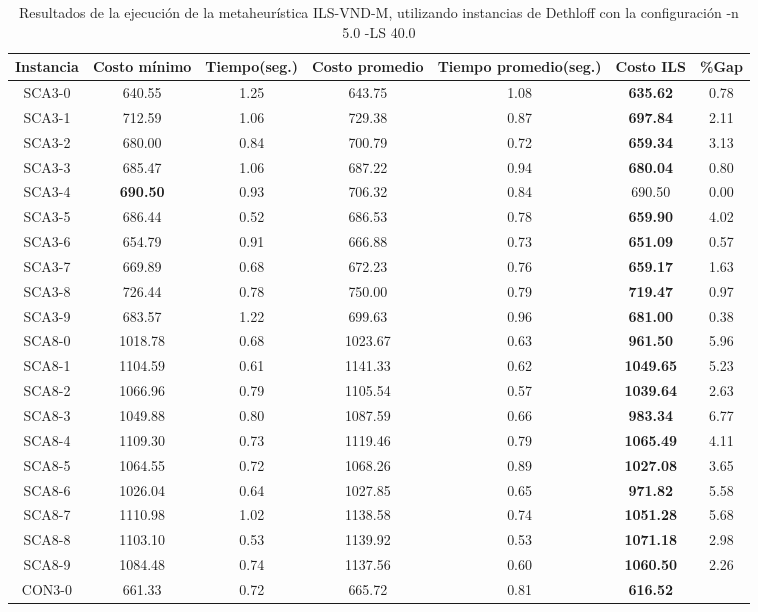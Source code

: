 \begin{table}[h]
\caption{Resultados de la ejecución de la metaheurística ILS-VND-M, utilizando instancias de Dethloff con la configuración -n 5.0 -LS 40.0}
\centering
\small
\begin{tabular}{c c c c c c c}
\hline\hline
Instancia & Costo mínimo & Tiempo(seg.) & Costo promedio & Tiempo promedio(seg.) & Costo ILS & \%Gap \\ [0.5ex]
\hline
SCA3-0 & 640.55 & 1.25 & 
643.75 & 1.08 & \bf{635.62} & 
0.78\\SCA3-1 & 712.59 & 1.06 & 
729.38 & 0.87 & \bf{697.84} & 
2.11\\SCA3-2 & 680.00 & 0.84 & 
700.79 & 0.72 & \bf{659.34} & 
3.13\\SCA3-3 & 685.47 & 1.06 & 
687.22 & 0.94 & \bf{680.04} & 
0.80\\SCA3-4 & \bf{690.50} & 0.93 & 
706.32 & 0.84 & 690.50 & 0.00\\
SCA3-5 & 686.44 & 0.52 & 
686.53 & 0.78 & \bf{659.90} & 
4.02\\SCA3-6 & 654.79 & 0.91 & 
666.88 & 0.73 & \bf{651.09} & 
0.57\\SCA3-7 & 669.89 & 0.68 & 
672.23 & 0.76 & \bf{659.17} & 
1.63\\SCA3-8 & 726.44 & 0.78 & 
750.00 & 0.79 & \bf{719.47} & 
0.97\\SCA3-9 & 683.57 & 1.22 & 
699.63 & 0.96 & \bf{681.00} & 
0.38\\SCA8-0 & 1018.78 & 0.68 & 
1023.67 & 0.63 & \bf{961.50} & 
5.96\\SCA8-1 & 1104.59 & 0.61 & 
1141.33 & 0.62 & \bf{1049.65} & 
5.23\\SCA8-2 & 1066.96 & 0.79 & 
1105.54 & 0.57 & \bf{1039.64} & 
2.63\\SCA8-3 & 1049.88 & 0.80 & 
1087.59 & 0.66 & \bf{983.34} & 
6.77\\SCA8-4 & 1109.30 & 0.73 & 
1119.46 & 0.79 & \bf{1065.49} & 
4.11\\SCA8-5 & 1064.55 & 0.72 & 
1068.26 & 0.89 & \bf{1027.08} & 
3.65\\SCA8-6 & 1026.04 & 0.64 & 
1027.85 & 0.65 & \bf{971.82} & 
5.58\\SCA8-7 & 1110.98 & 1.02 & 
1138.58 & 0.74 & \bf{1051.28} & 
5.68\\SCA8-8 & 1103.10 & 0.53 & 
1139.92 & 0.53 & \bf{1071.18} & 
2.98\\SCA8-9 & 1084.48 & 0.74 & 
1137.56 & 0.60 & \bf{1060.50} & 
2.26\\CON3-0 & 661.33 & 0.72 & 
665.72 & 0.81 & \bf{616.52} & 

\end{tabular}
\end{table}

